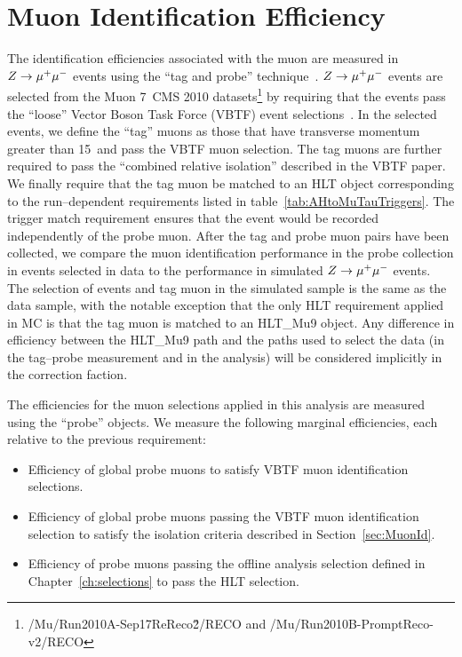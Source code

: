 \section{Muon Identification Efficiency} \label{sec:ZmumuTagAndProbe} 
%
The identification efficiencies associated with the muon are measured in $Z\to\mu^+\mu^-$
events using the ``tag and probe'' technique~\cite{CMS-PAS-EWK-10-002}.  $Z\to\mu^+\mu^-$
events are selected from the Muon 7~\TeV CMS 2010
datasets\footnote{\mbox{/Mu/Run2010A-Sep17ReReco\v2/RECO} and
\mbox{/Mu/Run2010B-PromptReco-v2/RECO} } by requiring that the events pass the
``loose'' Vector Boson Task Force (VBTF) event
selections~\cite{CMS-PAS-EWK-10-002}.  In the selected events, we define the
``tag'' muons as those that have transverse momentum greater than 15~\GeVc and
pass the VBTF muon selection.  The tag muons are further required to pass the
``combined relative isolation'' described in the VBTF paper.  We finally require
that the tag muon be matched to an HLT object corresponding to the
run--dependent requirements listed in table~\ref{tab:AHtoMuTauTriggers}.  The
trigger match requirement ensures that the event would be recorded independently
of the probe muon.  After the tag and probe muon pairs have been collected, we
compare the muon identification performance in the probe collection in events
selected in data to the performance in simulated $Z\to\mu^+\mu^-$ events.  The selection
of events and tag muon in the simulated sample is the same as the data sample,
with the notable exception that the only HLT requirement applied in MC is that
the tag muon is matched to an HLT\_Mu9 object.  Any difference in efficiency
between the HLT\_Mu9 path and the paths used to select the data (in the
tag--probe measurement and in the analysis) will be considered implicitly in the
correction faction. 

The efficiencies for the muon selections applied in this analysis are measured
using the ``probe'' objects.  We measure the following marginal efficiencies,
each relative to the previous requirement:
\begin{itemize}
\item Efficiency of global probe muons to satisfy VBTF muon identification
selections.
\item Efficiency of global probe muons passing the VBTF muon identification
selection to satisfy the isolation criteria described in
Section~\ref{sec:MuonId}.
\item Efficiency of probe muons passing the offline analysis selection defined
  in Chapter~\ref{ch:selections} to pass the HLT selection.
\end{itemize}

